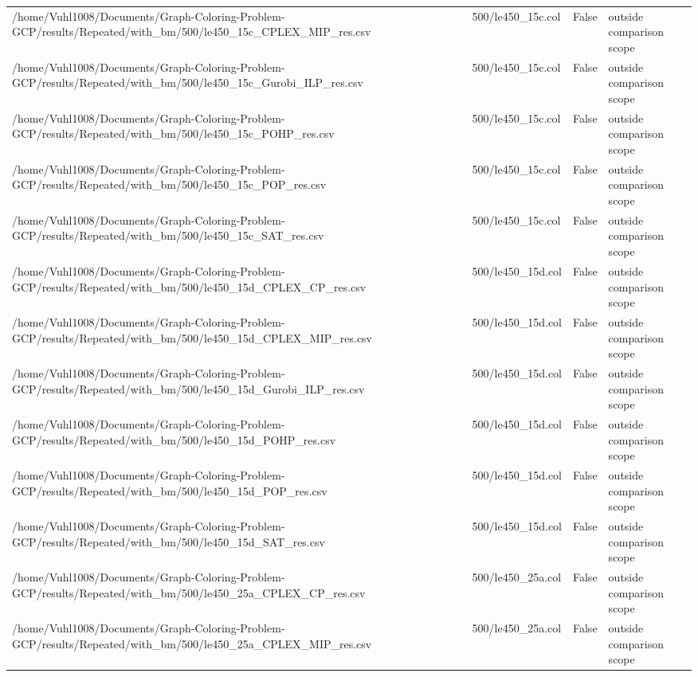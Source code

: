 \begin{table}[htbp]
\begin{tabular}{llll}
/home/Vuhl1008/Documents/Graph-Coloring-Problem-GCP/results/Repeated/with\_bm/500/le450\_15c\_CPLEX\_MIP\_res.csv & 500/le450\_15c.col & False & outside comparison scope \\
/home/Vuhl1008/Documents/Graph-Coloring-Problem-GCP/results/Repeated/with\_bm/500/le450\_15c\_Gurobi\_ILP\_res.csv & 500/le450\_15c.col & False & outside comparison scope \\
/home/Vuhl1008/Documents/Graph-Coloring-Problem-GCP/results/Repeated/with\_bm/500/le450\_15c\_POHP\_res.csv & 500/le450\_15c.col & False & outside comparison scope \\
/home/Vuhl1008/Documents/Graph-Coloring-Problem-GCP/results/Repeated/with\_bm/500/le450\_15c\_POP\_res.csv & 500/le450\_15c.col & False & outside comparison scope \\
/home/Vuhl1008/Documents/Graph-Coloring-Problem-GCP/results/Repeated/with\_bm/500/le450\_15c\_SAT\_res.csv & 500/le450\_15c.col & False & outside comparison scope \\
/home/Vuhl1008/Documents/Graph-Coloring-Problem-GCP/results/Repeated/with\_bm/500/le450\_15d\_CPLEX\_CP\_res.csv & 500/le450\_15d.col & False & outside comparison scope \\
/home/Vuhl1008/Documents/Graph-Coloring-Problem-GCP/results/Repeated/with\_bm/500/le450\_15d\_CPLEX\_MIP\_res.csv & 500/le450\_15d.col & False & outside comparison scope \\
/home/Vuhl1008/Documents/Graph-Coloring-Problem-GCP/results/Repeated/with\_bm/500/le450\_15d\_Gurobi\_ILP\_res.csv & 500/le450\_15d.col & False & outside comparison scope \\
/home/Vuhl1008/Documents/Graph-Coloring-Problem-GCP/results/Repeated/with\_bm/500/le450\_15d\_POHP\_res.csv & 500/le450\_15d.col & False & outside comparison scope \\
/home/Vuhl1008/Documents/Graph-Coloring-Problem-GCP/results/Repeated/with\_bm/500/le450\_15d\_POP\_res.csv & 500/le450\_15d.col & False & outside comparison scope \\
/home/Vuhl1008/Documents/Graph-Coloring-Problem-GCP/results/Repeated/with\_bm/500/le450\_15d\_SAT\_res.csv & 500/le450\_15d.col & False & outside comparison scope \\
/home/Vuhl1008/Documents/Graph-Coloring-Problem-GCP/results/Repeated/with\_bm/500/le450\_25a\_CPLEX\_CP\_res.csv & 500/le450\_25a.col & False & outside comparison scope \\
/home/Vuhl1008/Documents/Graph-Coloring-Problem-GCP/results/Repeated/with\_bm/500/le450\_25a\_CPLEX\_MIP\_res.csv & 500/le450\_25a.col & False & outside comparison scope \\

\end{tabular}
\end{table}

